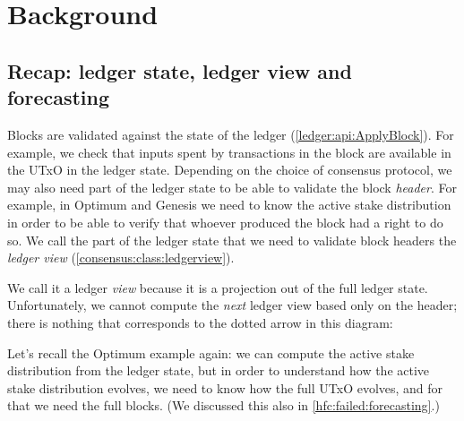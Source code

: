 \section{Background}

\subsection{Recap: ledger state, ledger view and forecasting}

Blocks are validated against the state of the ledger
(\cref{ledger:api:ApplyBlock}). For example, we check that inputs spent by
transactions in the block are available in the UTxO in the ledger state.
Depending on the choice of consensus protocol, we may also need part of the
ledger state to be able to validate the block \emph{header}. For example, in
Optimum and Genesis we need to know the active stake distribution in order to be
able to verify that whoever produced the block had a right to do so. We call the
part of the ledger state that we need to validate block headers the \emph{ledger
view} (\cref{consensus:class:ledgerview}).

We call it a ledger \emph{view} because it is a projection out of the full
ledger state. Unfortunately, we cannot compute the \emph{next} ledger view based only
on the header; there is nothing that corresponds to the dotted arrow in this
diagram:
%
\begin{center}
\end{center}
%
Let's recall the Optimum example again: we can compute the active stake
distribution from the ledger state, but in order to understand how the active
stake distribution evolves, we need to know how the full UTxO evolves, and for
that we need the full blocks. (We discussed this also in
\cref{hfc:failed:forecasting}.)

